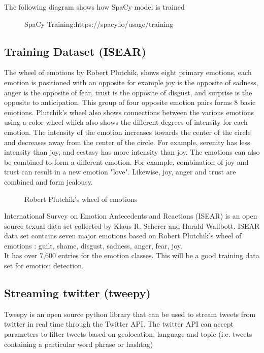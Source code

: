 The following diagram shows how SpaCy model is trained

\begin{figure}[h]
  \centering
  \caption[SpaCy Training]%
  {SpaCy Training:https://spacy.io/usage/training}
  \label{fig:ALAP:sm3}
\end{figure}
 
\clearpage

\subsection{Training Dataset (ISEAR)}

The wheel of emotions by Robert Plutchik, shows eight primary emotions, each emotion is positioned with an opposite for example joy is the opposite of sadness, anger is the opposite of fear, trust is the opposite of disgust, and surprise is the opposite to anticipation. This group of four opposite emotion pairs forms 8 basic emotions. Plutchik's wheel also shows connections between the various emotions using a color wheel which also shows the different degrees of intensity for each emotion. The intensity of the emotion increases towards the center of the circle and decreases away from the center of the circle. For example, serenity has less intensity than joy, and ecstasy has more intensity than joy. The emotions can also be combined to form a different emotion. For example, combination of joy and trust can result in a new emotion "love". Likewise, joy, anger and trust are combined and form jealousy\cite{ref:4}.

\begin{figure}[h]
  \centering
  \caption[Robert Plutchik's wheel of emotions]%
  {Robert Plutchik's wheel of emotions}
  \label{fig:ALAP:sm3}
\end{figure}

International Survey on Emotion Antecedents and Reactions (ISEAR) is an open source texual data set collected by Klaus R. Scherer and Harald Wallbott. 
ISEAR data set contains seven major emotions based on Robert Plutchik's wheel of emotions : guilt, shame, disgust, sadness, anger, fear,  joy.\\
It has over 7,600 entries for the emotion classes. This will be a good training data set for emotion detection.
\clearpage

\subsection{Streaming twitter (tweepy)}
Tweepy is an open source python library that can be used to stream tweets from twitter in real time through the Twitter API. The twitter API can accept parameters to filter tweets based on geolocation, language and topic (i.e. tweets containing a particular word phrase or hashtag)


